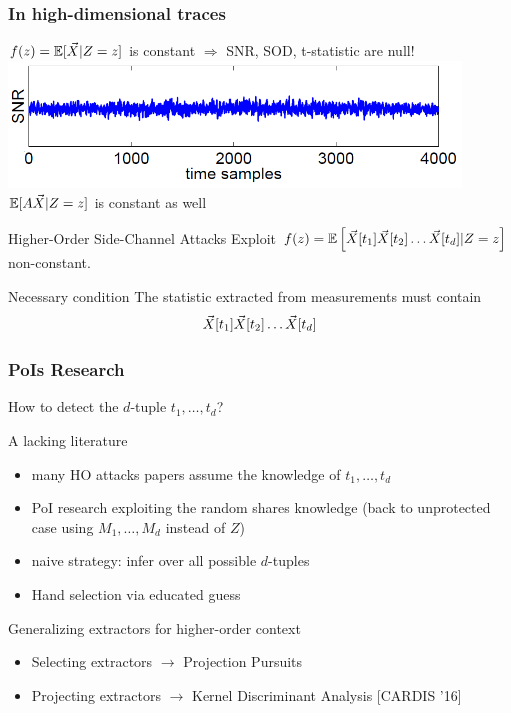 \begin{frame}
\frametitle{In high-dimensional traces}
$f(z) = \mathbb{E}[\vec{X}\lvert Z=z]$ is constant $\Rightarrow$ SNR, SOD, t-statistic are null!
\includegraphics[width = 0.9\textwidth]{figures/SNR_2order_new.png} \\
\pause
$\mathbb{E}[A\vec{X}\lvert Z=z]$ is constant as well 

\begin{block}{Higher-Order Side-Channel Attacks}
Exploit $f(z) = \mathbb{E}\left[\vec{X}[t_1]\vec{X}[t_2]\dots\vec{X}[t_d]\lvert Z=z\right]$ non-constant.
 \end{block}

\begin{block}{Necessary condition}
\cite{carlet2014achieving} The statistic extracted from measurements must contain  $$\vec{X}[t_1]\vec{X}[t_2]\dots\vec{X}[t_d]$$
\end{block} 
\end{frame}

\begin{frame}
\frametitle{PoIs Research}
How to detect the $d$-tuple $t_1,\dots, t_d$? 
\begin{block}{A lacking literature}
\begin{itemize}
\item many HO attacks papers assume the knowledge of $t_1,\dots, t_d$
\item PoI research exploiting the random shares knowledge (back to unprotected case using $M_1,\dots , M_d$ instead of $Z$)
\item naive strategy: infer over all possible $d$-tuples 
\item Hand selection via educated guess \cite{Oswald2006}
\end{itemize}
\end{block}

\begin{block}{Generalizing extractors for higher-order context}
\begin{itemize}
\item Selecting extractors $\longrightarrow$ Projection Pursuits \cite{PP}
\item Projecting extractors $\longrightarrow$ Kernel Discriminant Analysis [CARDIS '16]
\end{itemize}
\end{block}
\end{frame}

